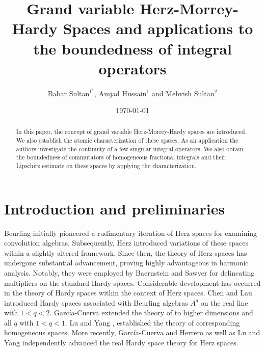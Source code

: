 \documentclass[oneside,reqno]{amsart}
\numberwithin{equation}{section}
\theoremstyle{definition}
\begin{document}
\title[Grand variable Herz-Morrey-Hardy spaces] {Grand variable Herz-Morrey-Hardy Spaces  and applications to the boundedness of integral operators}
\author[ ,B. Sultan, A. Hussain  M. Sultan ]{     Babar Sultan$^{1^*}$, Amjad Hussain$^{1}$ and  Mehvish Sultan$^2$ }%
\address{ $^{1^*}$Department of Mathematics, Quaid-I-Azam University, Islamabad  45320, Pakistan.}




%
\address{$^2$Department of Mathematics, Capital University of Science and Technology, Islamabad, Pakistan.}
%







\date{\today}
\dedicatory{}%
\begin{abstract}
In this paper, the concept of grand variable Herz-Morrey-Hardy spaces are introduced. We also establish the atomic characterization of these spaces. As an application the authors investigate the continuity of a few singular integral operators. We also obtain the boundedness of commutators of homogeneous fractional integrals and their Lipschitz estimate  on these spaces by applying the characterization. 
\end{abstract}
\maketitle








\section{Introduction and preliminaries }
Beurling \cite{grafakos2} initially pioneered a rudimentary iteration of Herz spaces for examining convolution algebras. Subsequently, Herz \cite{grafakos15} introduced variations of these spaces within a slightly altered framework. Since then, the theory of Herz spaces has undergone substantial advancement, proving highly advantageous in harmonic analysis. Notably, they were employed by Baernstein and Sawyer \cite{grafakos1} for delineating multipliers on the standard Hardy spaces. Considerable development has occurred in the theory of Hardy spaces within the context of Herz spaces. Chen and Lau \cite{grafakos3} introduced Hardy spaces associated with Beurling algebras $A^q$ on the real line with $1 < q < 2$. Garc\'ia-Cuerva \cite{grafakos10} extended the theory of \cite{grafakos3} to higher dimensions and all $q$ with $1 < q < 1$. Lu and Yang \cite{grafakos18,grafakos19},  established the theory of corresponding homogeneous spaces. More recently, García-Cuerva and Herrero \cite{grafakos11} as well as Lu and Yang \cite{grafakos20,grafakos21,grafakos22,grafakos23} independently advanced the real Hardy space theory for Herz spaces.
\end{document}
